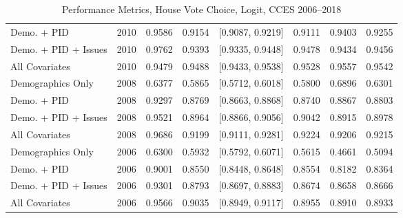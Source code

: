 \begin{table}[H]
\begin{tabular}{lrrrlrrr}
  Demo. + PID & 2010 & 0.9586 & 0.9154 & [0.9087, 0.9219] & 0.9111 & 0.9403 & 0.9255 \\ 
  Demo. + PID + Issues & 2010 & 0.9762 & 0.9393 & [0.9335, 0.9448] & 0.9478 & 0.9434 & 0.9456 \\ 
  All Covariates & 2010 & 0.9479 & 0.9488 & [0.9433, 0.9538] & 0.9528 & 0.9557 & 0.9542 \\ 
  Demographics Only & 2008 & 0.6377 & 0.5865 & [0.5712, 0.6018] & 0.5800 & 0.6896 & 0.6301 \\ 
  Demo. + PID & 2008 & 0.9297 & 0.8769 & [0.8663, 0.8868] & 0.8740 & 0.8867 & 0.8803 \\ 
  Demo. + PID + Issues & 2008 & 0.9521 & 0.8964 & [0.8866, 0.9056] & 0.9042 & 0.8915 & 0.8978 \\ 
  All Covariates & 2008 & 0.9686 & 0.9199 & [0.9111, 0.9281] & 0.9224 & 0.9206 & 0.9215 \\ 
  Demographics Only & 2006 & 0.6300 & 0.5932 & [0.5792, 0.6071] & 0.5615 & 0.4661 & 0.5094 \\ 
  Demo. + PID & 2006 & 0.9001 & 0.8550 & [0.8448, 0.8648] & 0.8554 & 0.8182 & 0.8364 \\ 
  Demo. + PID + Issues & 2006 & 0.9301 & 0.8793 & [0.8697, 0.8883] & 0.8674 & 0.8658 & 0.8666 \\ 
  All Covariates & 2006 & 0.9566 & 0.9035 & [0.8949, 0.9117] & 0.8955 & 0.8910 & 0.8933 \\ 
   \bottomrule
\end{tabular}
\caption{Performance Metrics, House Vote Choice, Logit, CCES 2006--2018} 
\label{tab:cces_house_logit}
\end{table}
